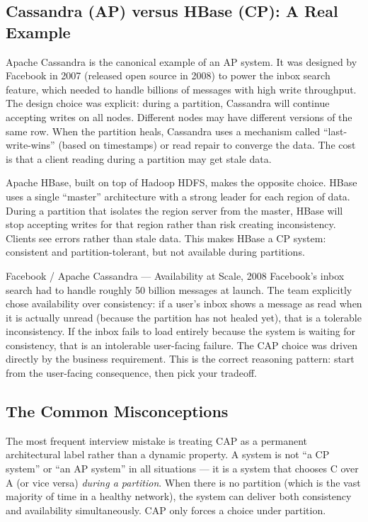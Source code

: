 \documentclass[11pt,a4paper]{article}
\begin{document}
\subsection{Cassandra (AP) versus HBase (CP): A Real Example}

Apache Cassandra is the canonical example of an AP system. It was designed by Facebook in 2007 (released open source in 2008) to power the inbox search feature, which needed to handle billions of messages with high write throughput. The design choice was explicit: during a partition, Cassandra will continue accepting writes on all nodes. Different nodes may have different versions of the same row. When the partition heals, Cassandra uses a mechanism called ``last-write-wins'' (based on timestamps) or read repair to converge the data. The cost is that a client reading during a partition may get stale data.

Apache HBase, built on top of Hadoop HDFS, makes the opposite choice. HBase uses a single ``master'' architecture with a strong leader for each region of data. During a partition that isolates the region server from the master, HBase will stop accepting writes for that region rather than risk creating inconsistency. Clients see errors rather than stale data. This makes HBase a CP system: consistent and partition-tolerant, but not available during partitions.

\begin{industrybox}{Facebook / Apache Cassandra --- Availability at Scale, 2008}
Facebook's inbox search had to handle roughly 50 billion messages at launch. The team explicitly chose availability over consistency: if a user's inbox shows a message as read when it is actually unread (because the partition has not healed yet), that is a tolerable inconsistency. If the inbox fails to load entirely because the system is waiting for consistency, that is an intolerable user-facing failure. The CAP choice was driven directly by the business requirement. This is the correct reasoning pattern: start from the user-facing consequence, then pick your tradeoff.
\end{industrybox}

\subsection{The Common Misconceptions}

The most frequent interview mistake is treating CAP as a permanent architectural label rather than a dynamic property. A system is not ``a CP system'' or ``an AP system'' in all situations --- it is a system that chooses C over A (or vice versa) \textit{during a partition}. When there is no partition (which is the vast majority of time in a healthy network), the system can deliver both consistency and availability simultaneously. CAP only forces a choice under partition.
\end{document}
